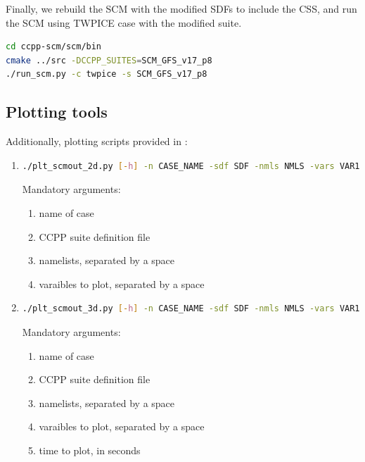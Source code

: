 

Finally, we rebuild the SCM with the modified SDFs to include the CSS, and run the SCM  using TWPICE case with the modified  suite.
\begin{lstlisting}[language=bash]
cd ccpp-scm/scm/bin
cmake ../src -DCCPP_SUITES=SCM_GFS_v17_p8
./run_scm.py -c twpice -s SCM_GFS_v17_p8
\end{lstlisting}

\subsection{Plotting tools}
\label{section:plotting_tools}

Additionally, plotting scripts provided in :

\begin{enumerate}
\item
\begin{lstlisting}[language=bash]
./plt_scmout_2d.py [-h] -n CASE_NAME -sdf SDF -nmls NMLS -vars VAR1 VAR2 VAR3
\end{lstlisting}

Mandatory arguments:
\begin{enumerate}
\item {} name of case
\item {} CCPP suite definition file
\item {} namelists, separated by a space
\item {} varaibles to plot, separated by a space
\end{enumerate}

\item
\begin{lstlisting}[language=bash]
./plt_scmout_3d.py [-h] -n CASE_NAME -sdf SDF -nmls NMLS -vars VAR1 VAR2 VAR3 -time TIME
\end{lstlisting}

Mandatory arguments:
\begin{enumerate}
\item {} name of case
\item {} CCPP suite definition file
\item {} namelists, separated by a space
\item {} varaibles to plot, separated by a space
\item {} time to plot, in seconds
\end{enumerate}

\end{enumerate}
